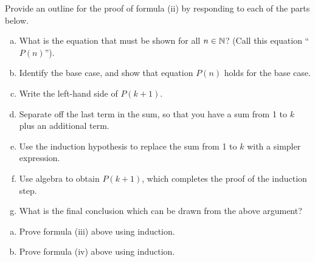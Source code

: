 \begin{exercise}{}
Provide an outline for the proof of formula (ii) by responding to each of the parts below.

\begin{enumerate}[(a)]
\item
What is the equation that must be shown  for all $n\in\mathbb{N}$?  (Call this equation ``$P(n)$'').
\item
Identify the base case, and show that equation $P(n)$  holds for the base case.
\item
Write the left-hand side of  $P( k+1)$.
\item
Separate off the last term in the sum, so that you have a sum from 1 to $k$ plus an additional term.
\item
Use the induction hypothesis to replace the sum from 1 to $k$ with a simpler expression.
\item
Use algebra to obtain $P(k+1)$, which completes the proof of the induction step. 
\item 
What is the final conclusion which can be drawn from the above argument?
\end{enumerate}

\end{exercise}

\begin{exercise}{}
\begin{enumerate}[(a)]
\item
Prove formula (iii) above using induction.
\item
Prove formula (iv) above using induction.
\end{enumerate}
\end{exercise}


%
%
%


